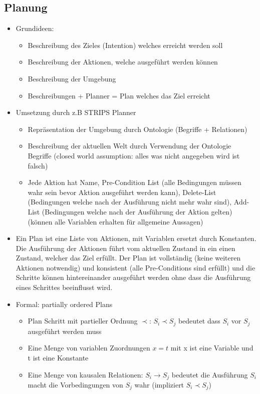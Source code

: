\documentclass{article} %
\begin{document}
	\subsection{Planung}
	\begin{itemize}
		\item Grundideen:
		\begin{itemize}
			\item Beschreibung des Zieles (Intention) welches erreicht werden soll
			\item Beschreibung der Aktionen, welche ausgeführt werden können
			\item Beschreibung der Umgebung
			\item Beschreibungen + Planner = Plan welches das Ziel erreicht
		\end{itemize}
		\item Umsetzung durch z.B STRIPS Planner
		\begin{itemize}
			\item Repräsentation der Umgebung durch Ontologie (Begriffe + Relationen)
			\item Beschreibung der aktuellen Welt durch Verwendung der Ontologie Begriffe (closed world assumption: alles was nicht angegeben wird ist falsch)
			\item Jede Aktion hat Name, Pre-Condition List (alle Bedingungen müssen wahr sein bevor Aktion ausgeführt werden kann), Delete-List (Bedingungen welche nach der Ausführung nicht mehr wahr sind), Add-List (Bedingungen welche nach der Ausführung der Aktion gelten) (können alle Variablen erhalten für allgemeine Aussagen)
		\end{itemize}
		\item Ein Plan ist eine Liste von Aktionen, mit Variablen ersetzt durch Konstanten. Die Ausführung der Aktionen führt vom aktuellen Zustand in ein einen Zustand, welcher das Ziel erfüllt. Der Plan ist vollständig (keine weiteren Aktionen notwendig) und konsistent (alle Pre-Conditions sind erfüllt) und die Schritte können hintereinander ausgeführt werden ohne dass die Ausführung eines Schrittes beeinflusst wird.
		\item Formal: partially ordered Plans
		\begin{itemize}
			\item Plan Schritt mit partieller Ordnung $\prec$: $S_{i} \prec S_{j}$ bedeutet dass $S_{i}$ vor $S_{j}$ ausgeführt werden muss
			\item Eine Menge von variablen Zuordnungen $x=t$ mit x ist eine Variable und t ist eine Konstante
			\item Eine Menge von kausalen Relationen: $S_{i} \rightarrow S_{j}$ bedeutet die Ausführung $S_{i}$ macht die Vorbedingungen von $S_{j}$ wahr (impliziert  $S_{i} \prec S_{j}$)

\end{itemize}
\end{itemize}
\end{document}
